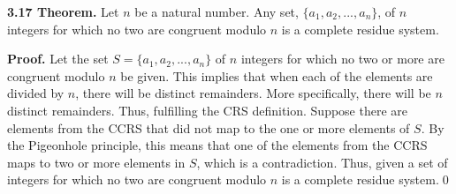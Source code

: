 \documentclass[12pt]{article}
\begin{document}
\noindent\textbf{3.17 Theorem.} Let $n$ be a natural number. Any set, $\{a_1,a_2,...,a_n\}$, of $n$ integers for which no two are congruent modulo $n$ is a complete residue system.

\bigskip

\noindent\textbf{Proof.} Let the set $S=\{a_1,a_2,...,a_n\}$ of $n$ integers for which no two or more are congruent modulo $n$ be given. This implies that when each of the elements are divided by $n$, there will be distinct remainders. More specifically, there will be $n$ distinct remainders. Thus, fulfilling the CRS definition. Suppose there are elements from the CCRS that did not map to the one or more elements of $S$. By the Pigeonhole principle, this means that one of the elements from the CCRS maps to two or more elements in $S$, which is a contradiction. Thus, given a set of integers for which no two are congruent modulo $n$ is a complete residue system.\qed
\end{document}
